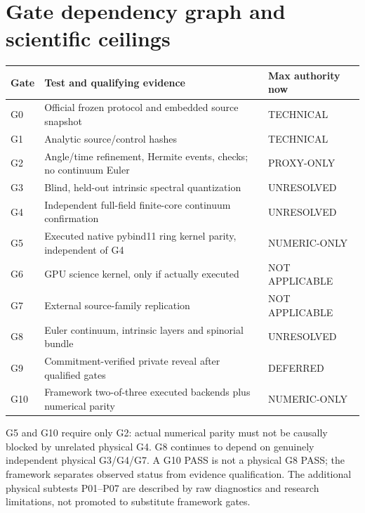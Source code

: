 \documentclass[10pt,a4paper]{article}
\begin{document}
\section{Gate dependency graph and scientific ceilings}
\small\begin{longtable}{p{.12\linewidth}p{.62\linewidth}p{.18\linewidth}}\toprule Gate & Test and qualifying evidence & Max authority now\\\midrule\endhead
G0 & Official frozen protocol and embedded source snapshot & TECHNICAL\\
G1 & Analytic source/control hashes & TECHNICAL\\
G2 & Angle/time refinement, Hermite events, checks; no continuum Euler & PROXY-ONLY\\
G3 & Blind, held-out intrinsic spectral quantization & UNRESOLVED\\
G4 & Independent full-field finite-core continuum confirmation & UNRESOLVED\\
G5 & Executed native pybind11 ring kernel parity, independent of G4 & NUMERIC-ONLY\\
G6 & GPU science kernel, only if actually executed & NOT APPLICABLE\\
G7 & External source-family replication & NOT APPLICABLE\\
G8 & Euler continuum, intrinsic layers and spinorial bundle & UNRESOLVED\\
G9 & Commitment-verified private reveal after qualified gates & DEFERRED\\
G10 & Framework two-of-three executed backends plus numerical parity & NUMERIC-ONLY\\\bottomrule\end{longtable}\normalsize
G5 and G10 require only G2: actual numerical parity must not be causally blocked by unrelated physical G4. G8 continues to depend on genuinely independent physical G3/G4/G7. A G10 PASS is not a physical G8 PASS; the framework separates observed status from evidence qualification. The additional physical subtests P01--P07 are described by raw diagnostics and research limitations, not promoted to substitute framework gates.

\end{document}
